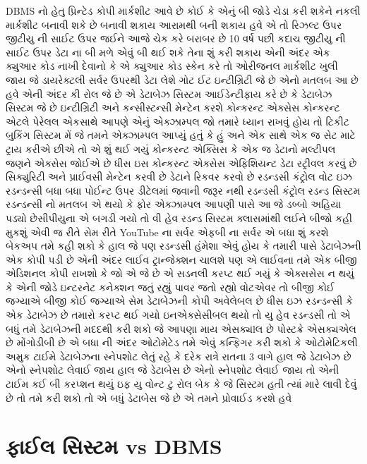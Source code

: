 \documentclass[aspectratio=169, 10pt]{beamer}
\begin{document}
\begin{frame}{DBMS નો હેતુ}
{પ્રિન્ટેડ કોપી માર્કશીટ આવે છે કોઈ કે એનું બી જોડે ચેડા કરી શકેને નકલી માર્કશીટ બનાવી શકે છે બનાવી શકાય આરામથી બની શકાય હવે એ તો રિઝલ્ટ ઉપર જીટીયુ ની સાઈટ ઉપર જઈને આજે ચેક કરે બરાબર છે 10 વર્ષ પછી કદાચ જીટીયુ ની સાઈટ ઉપર ડેટા ના બી મળે એવું બી થઈ શકે તેના શું કરી શકાય એની અંદર એક ક્યુઆર કોડ નાખી દેવાનો કે એ ક્યુઆર કોડ સ્કેન કરે તો ઓરીજનલ માર્કશીટ ખુલી જાય જે ડાયરેક્ટલી સર્વર ઉપરથી ડેટા લેશે ગોટ ઈટ ઇન્ટીગ્રિટી જે છે એનો મતલબ આ છે હવે એની અંદર કી રોલ જે છે એ ડેટાબેઝ સિસ્ટમ આઈડેન્ટીફાય કરે છે કે ડેટાબેઝ સિસ્ટમ જે છે ઇન્ટીગ્રિટી અને કન્સીસ્ટન્સી મેન્ટેન કરશે કોન્કરન્ટ એક્સેસ કોન્કરન્ટ એટલે પેરેલલ એકસાથે આપણે એનું એક્ઝામ્પલ જો તમારે ધ્યાન રાખવું હોય તો ટિકીટ બુકિંગ સિસ્ટમ મેં જે તમને એક્ઝામ્પલ આપ્યું હતું કે હું અને એક સાથે એક જ સેટ માટે ટ્રાય કરીએ છીએ તો એ શું થઈ ગયું કોન્કરન્ટ એક્સિસ કે એક જ ડેટાનો મલ્ટીપલ જણને એક્સેસ જોઈએ છે ધીસ ઇસ કોન્કરન્ટ એક્સેસ એફિશિયન્ટ ડેટા રટ્રીવલ કરવું છે સિક્યુરિટી અને પ્રાઈવસી મેન્ટેન કરવી છે ડેટાને રિકવર કરવો છે રડન્ડસી કંટ્રોલ વોટ ઇઝ રડન્ડન્સી બધા બધા પોઈન્ટ ઉપર ડીટેલમાં જવાની જરૂર નથી રડન્ડસી કંટ્રોલ રડન્ડ સિસ્ટમ રડન્ડન્સી નો મતલબ એ થયો કે ફોર એક્ઝામ્પલ આપણી પાસે આ જે ડબ્બો અહિયા પડ્યો છેસીપીયુના એ બગડી ગયો તો વી હેવ રડન્ડ સિસ્ટમ ક્લાસમાંથી લઈને બીજો કહી મુકશું એવી જ રીતે સેમ રીતે YouTube ના સર્વર એફબી ના સર્વર એ બધા શું કરશે બેકઅપ તમે કહી શકો કે હાલ જે પણ રડન્ડસી હંમેશા એવું હોય કે તમારી પાસે ડેટાબેઝની એક કોપી પડી છે એની અંદર લાઈવ ટ્રાન્જેક્શન ચાલશે પણ એ લાઈવના તમે એક બીજી એડિશનલ કોપી રાખશો કે જો એ જે છે એ સડનલી કરપ્ટ થઈ ગયું કે એક્સસેસ ન થયું કે એની જોડે ઇન્ટરનેટ કનેક્શન જતું રહ્યું પાવર જતો રહ્યો વોટએવર તો બીજી કોઈ જગ્યાએ બીજી કોઈ જગ્યાએ સેમ ડેટાબેઝની કોપી અવેલેબલ છે ધીસ ઇઝ રડન્ડન્સી કે એક ડેટાબેઝ છે તમારો કરપ્ટ થઈ ગયો ઇનએક્સેસીબલ થયો તો યુ હેવ રડન્ડસી તો એ બધું તમે ડેટાબેઝની મદદથી કરી શકો જે આપણા માય એસક્યlલ છે પોસ્ટક્રે એસક્યએલ છે મોંગોડીબી છે એ બધા ની અંદર ઓટોમેટેડ તમે એવું કન્ફિગર કરી શકો કે ઓટોમેટિકલી અમુક ટાઈમે ડેટાબેઝના સ્નેપશોટ લેતું રહે કે દરેક રાત્રે રાતના 3 વાગે હાલ જે ડેટાબેઝ છે એનો સ્નેપશોટ લેવાઈ જાય હાલ જે ડેટાબેસ છે એનો સ્નેપશોટ લેવાઈ જાય તો એની ટાઈમ કઈ બી કરપ્શન થયું ઇફ યુ વોન્ટ ટુ રોલ બેક કે જે સિસ્ટમ હતી ત્યાં મારે લાવી દેવું છે તો તમે કરી શકો તો એ બધું ડેટાબેસ જે છે એ તમને પ્રોવાઈડ કરશે હવે
}
\end{frame}

\section{ફાઈલ સિસ્ટમ vs DBMS}
\end{document}
